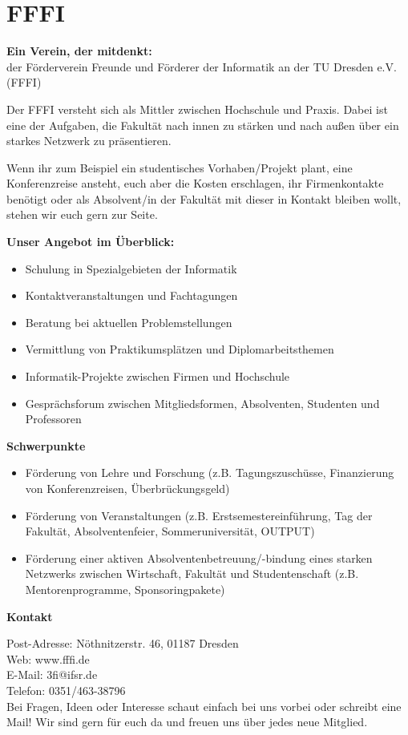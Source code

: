 \chapter{FFFI}

\textbf{Ein Verein, der mitdenkt:} \\
der Förderverein Freunde und Förderer der Informatik an der TU Dresden e.V. (FFFI)

Der FFFI versteht sich als Mittler zwischen Hochschule und Praxis.
Dabei ist eine der Aufgaben, die Fakultät nach innen zu stärken und nach außen über ein starkes Netzwerk zu präsentieren.

Wenn ihr zum Beispiel ein studentisches Vorhaben/Projekt plant, eine Konferenzreise ansteht, euch aber die Kosten erschlagen, ihr Firmenkontakte benötigt oder als Absolvent/in der Fakultät mit dieser in Kontakt bleiben wollt, stehen wir euch gern zur Seite.

\textbf{Unser Angebot im Überblick:}

\begin{itemize}
\item Schulung in Spezialgebieten der Informatik
\item Kontaktveranstaltungen und Fachtagungen
\item Beratung bei aktuellen Problemstellungen
\item Vermittlung von Praktikumsplätzen und Diplomarbeitsthemen
\item Informatik-Projekte zwischen Firmen und Hochschule
\item Gesprächsforum zwischen Mitgliedsformen, Absolventen, Studenten und Professoren
\end{itemize}

\textbf{Schwerpunkte}

\begin{itemize}
\item Förderung von Lehre und Forschung (z.B. Tagungszuschüsse, Finanzierung von Konferenzreisen, Überbrückungsgeld)
\item Förderung von Veranstaltungen (z.B. Erstsemestereinführung, Tag der Fakultät, Absolventenfeier, Sommeruniversität, OUTPUT)
\item Förderung einer aktiven Absolventenbetreuung/-bindung eines starken Netzwerks zwischen Wirtschaft, Fakultät und Studentenschaft (z.B. Mentorenprogramme, Sponsoringpakete)
\end{itemize}

\textbf{Kontakt}

Post-Adresse: Nöthnitzerstr. 46, 01187 Dresden \\
Web: www.fffi.de \\
E-Mail: 3fi@ifsr.de \\
Telefon: 0351/463-38796 \\

Bei Fragen, Ideen oder Interesse schaut einfach bei uns vorbei oder schreibt eine Mail!
Wir sind gern für euch da und freuen uns über jedes neue Mitglied.

